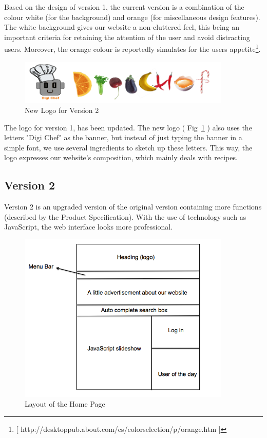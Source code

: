 Based on the design of version 1, the current version is a combination of the colour white (for the background) and orange (for miscellaneous design features). The white background gives our website a non-cluttered feel, this being an important criteria for retaining the attention of the user and avoid distracting users. Moreover, the orange colour is reportedly simulates for the users appetite\footnote{[ http://desktoppub.about.com/cs/colorselection/p/orange.htm ]}. 

\begin{figure}[h]
\begin{center}
\includegraphics[width=0.9\textwidth]{logowebsite}
\caption{New Logo for Version 2}
\label{fig:logowebsite}
\end{center}
\end{figure}

The logo for version 1, has been updated. The new logo ( Fig~\ref{fig:logowebsite} ) also uses the letters "Digi Chef" as the banner, but instead of just typing the banner in a simple font, we use several ingredients to sketch up these letters. This way, the logo expresses our website's composition, which mainly deals with recipes. 

\subsection{Version 2}

Version 2 is an upgraded version of the original version containing more functions (described by the Product Specification). With the use of technology such as JavaScript, the web interface looks more professional. 

\begin{figure}[h]
\begin{center}
\includegraphics[width=0.9\textwidth]{home_page_v2}
\caption{Layout of the Home Page}
\label{fig:home_page}
\end{center}
\end{figure}

